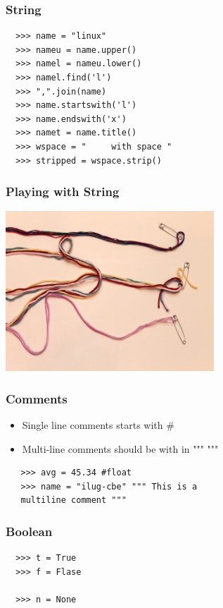 \documentclass{beamer}
\begin{document}
\begin{frame}[fragile]
 \frametitle{String}
 \begin{verbatim}
  >>> name = "linux"
  >>> nameu = name.upper()
  >>> namel = nameu.lower()
  >>> namel.find('l')
  >>> ",".join(name)
  >>> name.startswith('l')
  >>> name.endswith('x')
  >>> namet = name.title()
  >>> wspace = "     with space "
  >>> stripped = wspace.strip()
 \end{verbatim}

\end{frame}

\begin{frame}
 \frametitle{Playing with String}
 \begin{center}
  \includegraphics[height=6cm]{string.jpg}
 \end{center}
\end{frame}

\begin{frame}[fragile]
 \frametitle{Comments}
 \begin{itemize}
  \item Single line comments starts with \#
  \item Multi-line comments should be with in """ """
   \end{itemize}
\begin{verbatim}
   >>> avg = 45.34 #float
   >>> name = "ilug-cbe" """ This is a 
   multiline comment """
  \end{verbatim}
\end{frame}

\begin{frame}[fragile]
 \frametitle{Boolean}
\begin{center}
  \begin{verbatim}
  >>> t = True
  >>> f = Flase
  
  >>> n = None
 \end{verbatim}
\end{center}

\end{frame}
\end{document}
